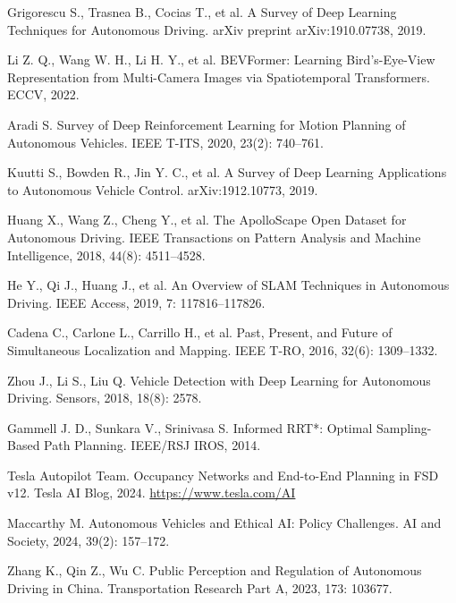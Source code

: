 \documentclass[12pt,a4paper]{article}
\begin{document}

\begin{thebibliography}{99}

Grigorescu S., Trasnea B., Cocias T., et al. A Survey of Deep Learning Techniques for Autonomous Driving. arXiv preprint arXiv:1910.07738, 2019.

Li Z. Q., Wang W. H., Li H. Y., et al. BEVFormer: Learning Bird's-Eye-View Representation from Multi-Camera Images via Spatiotemporal Transformers. ECCV, 2022.

Aradi S. Survey of Deep Reinforcement Learning for Motion Planning of Autonomous Vehicles. IEEE T-ITS, 2020, 23(2): 740–761.

Kuutti S., Bowden R., Jin Y. C., et al. A Survey of Deep Learning Applications to Autonomous Vehicle Control. arXiv:1912.10773, 2019.

Huang X., Wang Z., Cheng Y., et al. The ApolloScape Open Dataset for Autonomous Driving. IEEE Transactions on Pattern Analysis and Machine Intelligence, 2018, 44(8): 4511–4528.

He Y., Qi J., Huang J., et al. An Overview of SLAM Techniques in Autonomous Driving. IEEE Access, 2019, 7: 117816–117826.

Cadena C., Carlone L., Carrillo H., et al. Past, Present, and Future of Simultaneous Localization and Mapping. IEEE T-RO, 2016, 32(6): 1309–1332.

Zhou J., Li S., Liu Q. Vehicle Detection with Deep Learning for Autonomous Driving. Sensors, 2018, 18(8): 2578.

Gammell J. D., Sunkara V., Srinivasa S. Informed RRT*: Optimal Sampling-Based Path Planning. IEEE/RSJ IROS, 2014.

Tesla Autopilot Team. Occupancy Networks and End-to-End Planning in FSD v12. Tesla AI Blog, 2024. \url{https://www.tesla.com/AI}

Maccarthy M. Autonomous Vehicles and Ethical AI: Policy Challenges. AI and Society, 2024, 39(2): 157–172.

Zhang K., Qin Z., Wu C. Public Perception and Regulation of Autonomous Driving in China. Transportation Research Part A, 2023, 173: 103677.

\end{thebibliography}
\end{document}
